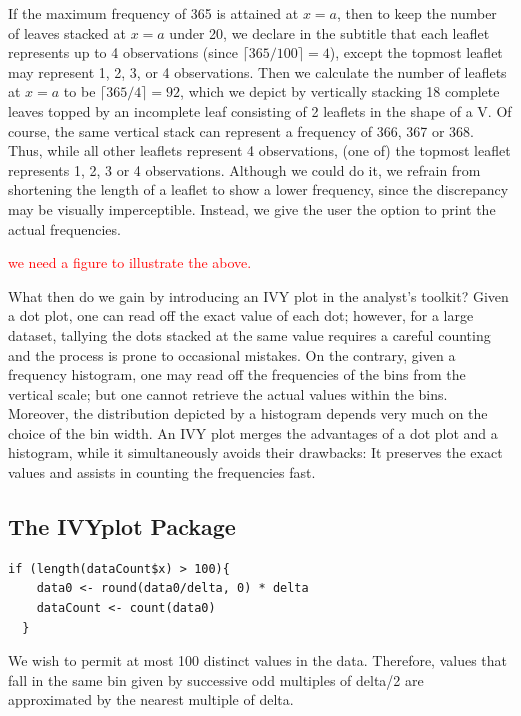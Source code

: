 If the maximum frequency of 365 is attained at \(x=a\), then to keep the
number of leaves stacked at \(x=a\) under 20, we declare in the subtitle
that each leaflet represents up to 4 observations (since
\(\lceil 365/100 \rceil =4\)), except the topmost leaflet may represent
1, 2, 3, or 4 observations. Then we calculate the number of leaflets at
\(x=a\) to be \(\lceil 365/4\rceil=92\), which we depict by vertically
stacking 18 complete leaves topped by an incomplete leaf consisting of 2
leaflets in the shape of a V. Of course, the same vertical stack can
represent a frequency of 366, 367 or 368. Thus, while all other leaflets
represent 4 observations, (one of) the topmost leaflet represents 1, 2,
3 or 4 observations. Although we could do it, we refrain from shortening
the length of a leaflet to show a lower frequency, since the discrepancy
may be visually imperceptible. Instead, we give the user the option to
print the actual frequencies.

\textcolor{red}{we need a figure to illustrate the above.}

What then do we gain by introducing an IVY plot in the analyst's
toolkit? Given a dot plot, one can read off the exact value of each dot;
however, for a large dataset, tallying the dots stacked at the same
value requires a careful counting and the process is prone to occasional
mistakes. On the contrary, given a frequency histogram, one may read off
the frequencies of the bins from the vertical scale; but one cannot
retrieve the actual values within the bins. Moreover, the distribution
depicted by a histogram depends very much on the choice of the bin
width. An IVY plot merges the advantages of a dot plot and a histogram,
while it simultaneously avoids their drawbacks: It preserves the exact
values and assists in counting the frequencies fast.

\hypertarget{the-ivyplot-package-1}{%
\subsection{The IVYplot Package}\label{the-ivyplot-package-1}}

\begin{verbatim}
if (length(dataCount$x) > 100){
    data0 <- round(data0/delta, 0) * delta
    dataCount <- count(data0)
  }
\end{verbatim}

We wish to permit at most 100 distinct values in the data. Therefore,
values that fall in the same bin given by successive odd multiples of
delta/2 are approximated by the nearest multiple of delta.

